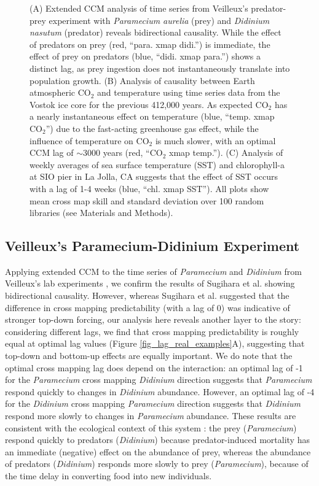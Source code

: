 \begin{figure}[!ht]
{(A) Extended CCM analysis of time series from Veilleux's predator-prey experiment \cite{Veilleux_1976} with \emph{Paramecium aurelia} (prey) and \emph{Didinium nasutum} (predator) reveals bidirectional causality. While the effect of predators on prey (red, ``para. xmap didi.'') is immediate, the effect of prey on predators (blue, ``didi. xmap para.'') shows a distinct lag, as prey ingestion does not instantaneously translate into population growth. (B) Analysis of causality between Earth atmospheric CO$_2$ and temperature using time series data from the Vostok ice core for the previous 412,000 years. As expected CO$_2$ has a nearly instantaneous effect on temperature (blue, ``temp. xmap CO$_2$'') due to the fast-acting greenhouse gas effect, while the influence of temperature on CO$_2$ is much slower, with an optimal CCM lag of $\sim 3000$ years (red, ``CO$_2$ xmap temp.''). (C) Analysis of weekly averages of sea surface temperature (SST) and chlorophyll-a at SIO pier in La Jolla, CA suggests that the effect of SST occurs with a lag of 1-4 weeks (blue, ``chl. xmap SST''). All plots show mean cross map skill and standard deviation over 100 random libraries (see Materials and Methods).}
\end{figure}

\subsection{Veilleux's Paramecium-Didinium Experiment}

Applying extended CCM to the time series of \emph{Paramecium} and \emph{Didinium} from Veilleux's lab experiments \cite{Veilleux_1976}, we confirm the results of Sugihara et al. \cite{Sugihara_2012} showing bidirectional causality. However, whereas Sugihara et al. suggested that the difference in cross mapping predictability (with a lag of 0) was indicative of stronger top-down forcing, our analysis here reveals another layer to the story: considering different lags, we find that cross mapping predictability is roughly equal at optimal lag values (Figure \ref{fig_lag_real_examples}A), suggesting that top-down and bottom-up effects are equally important. We do note that the optimal cross mapping lag does depend on the interaction: an optimal lag of -1 for the \emph{Paramecium} cross mapping \emph{Didinium} direction suggests that \emph{Paramecium} respond quickly to changes in \emph{Didinium} abundance. However, an optimal lag of -4 for the \emph{Didinium} cross mapping \emph{Paramecium} direction suggests that \emph{Didinium} respond more slowly to changes in \emph{Paramecium} abundance. These results are consistent with the ecological context of this system \cite{Li_2013}: the prey (\emph{Paramecium}) respond quickly to predators (\emph{Didinium}) because predator-induced mortality has an immediate (negative) effect on the abundance of prey, whereas the abundance of predators (\emph{Didinium}) responds more slowly to prey (\emph{Paramecium}), because of the time delay in converting food into new individuals.

